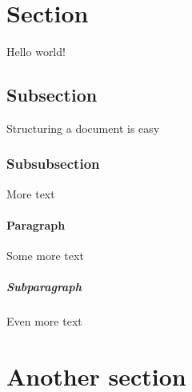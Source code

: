 \documentclass{article}
\begin{document}
\section{Section}
Hello world!
\subsection{Subsection}
Structuring a document is easy
\subsubsection{Subsubsection}
More text
\paragraph{Paragraph}
Some more text
\subparagraph{Subparagraph}
Even more text
\section{Another section}
\end{document}
